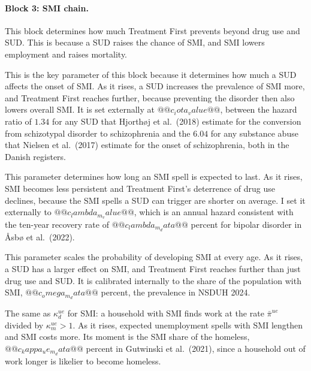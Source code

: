 \documentclass[10pt]{article}
\begin{document}
\paragraph{Block 3: SMI chain.}   This block determines how much  Treatment First prevents beyond drug use and SUD. This is because a SUD raises the chance of SMI, and SMI lowers employment and raises mortality.
\begin{description}\setlength{\itemsep}{0.25em}\setlength{\parskip}{0em}
\item[$\iota$, the SUD multiplier on SMI onset.]   This is the key parameter of this block because it determines how much a SUD affects the onset of SMI. As it rises, a SUD increases the prevalence of SMI more, and Treatment First reaches further, because preventing the disorder then also lowers overall SMI. It is set externally at $@@c_iota_value@@$, between the hazard ratio of $1.34$ for any SUD that Hjorth\o j et al.\ (2018) estimate for the conversion from schizotypal disorder to schizophrenia and the $6.04$ for any substance abuse that Nielsen et al.\ (2017) estimate for the onset of schizophrenia, both in the Danish registers.
\item[$\lambda_m$, the annual chance of recovering from SMI.]   This parameter determines how long an SMI spell is expected to last. As it rises, SMI becomes less persistent and Treatment First's deterrence of drug use declines, because the SMI spells a SUD can trigger are shorter on average. I set it externally to $@@c_lambda_m_value@@$, which is an annual hazard consistent with the ten-year recovery rate of $@@c_lambda_m_data@@$ percent for bipolar disorder in {\AA}sb{\o} et al.\ (2022).
\item[$\omega_m$, the level of the SMI onset profile.]   This parameter scales the probability of developing SMI at every age. As it rises, a SUD has a larger effect on SMI, and Treatment First reaches further than just drug use and SUD. It is calibrated internally to the share of the population with SMI, $@@c_omega_m_data@@$ percent, the prevalence in NSDUH 2024.
\item[$\kappa^{ue}_{m}$, how much less likely it is to regain employment with SMI.] The same as $\kappa^{ue}_{d}$ for SMI: a household with SMI finds work at the rate $\bar\pi^{ue}$ divided by $\kappa^{ue}_{m}{}>1$. As it rises, expected unemployment spells with SMI lengthen and SMI costs more. Its moment is the SMI share of the homeless, $@@c_kappa_ue_m_data@@$ percent in Gutwinski et al.\ (2021), since a household out of work longer is likelier to become homeless.

\end{description}
\end{document}
